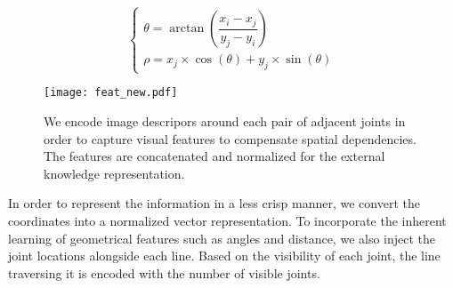 \documentclass[journal ]{IEEEtran}
\begin{document}
\begin{equation}
\begin{cases} 
\theta  =  \arctan (\dfrac{x_{i} - x_{j}}{y_{j} - y_{i}}) \\ 
\rho =  x_{j} \times \cos(\theta) + y_{j}   \times \sin(\theta) 
\end{cases} 
\end{equation}

\begin{figure}[t]
	\begin{center}
		\texttt{[image: feat\_new.pdf]}
	\end{center}
	\caption{We encode image descripors around each pair of adjacent joints in order to capture visual features to compensate spatial dependencies. The features are concatenated and normalized for the external knowledge representation.}
	\label{fig:feat}
\end{figure}

In order to represent the information in a less crisp manner, we convert the coordinates into a normalized vector representation. To incorporate the inherent learning of geometrical features such as angles and distance, we also inject the joint locations alongside each line. Based on the visibility of each joint, the line traversing it is encoded with the number of visible joints.
\end{document}
